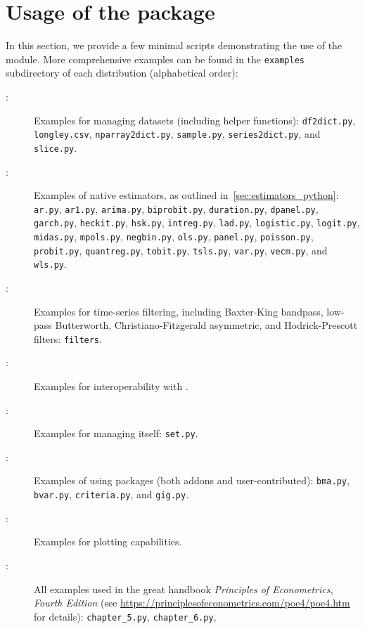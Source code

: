 \chapter{Usage of the package}\label{sec:usage_of_the_package}
In this section, we provide a few minimal \python
scripts demonstrating the use of the \gretlpy module.
More comprehensive examples can be found in the
\texttt{examples} subdirectory of each \gretlpy distribution
(alphabetical order):
\begin{description}
	\item[:] Examples for managing
		datasets (including helper functions): \texttt{df2dict.py},
		\texttt{longley.csv}, \texttt{nparray2dict.py},
		\texttt{sample.py}, \texttt{series2dict.py},
		and \texttt{slice.py}.
	\item[:] Examples of native estimators,
		as outlined in~\ref{sec:estimators_python}: \texttt{ar.py},
		\texttt{ar1.py}, \texttt{arima.py}, \texttt{biprobit.py},
		\texttt{duration.py}, \texttt{dpanel.py}, \texttt{garch.py},
		\texttt{heckit.py}, \texttt{hsk.py}, \texttt{intreg.py},
		\texttt{lad.py}, \texttt{logistic.py}, \texttt{logit.py},
		\texttt{midas.py}, \texttt{mpols.py}, \texttt{negbin.py}, \texttt{ols.py},
		\texttt{panel.py}, \texttt{poisson.py}, \texttt{probit.py},
		\texttt{quantreg.py}, \texttt{tobit.py}, \texttt{tsls.py},
		\texttt{var.py}, \texttt{vecm.py}, and \texttt{wls.py}.
	\item[:] Examples for time-series filtering,
		including Baxter-King bandpass, low-pass Butterworth,
		Christiano-Fitzgerald asymmetric, and Hodrick-Prescott
		filters: \texttt{filters}.
	\item[:] Examples for interoperability with \hansl.
	\item[:] Examples for managing
		\gretlpy itself: \texttt{set.py}.
	\item[:] Examples of using \gretl packages
		(both addons and user-contributed): \texttt{bma.py}, \texttt{bvar.py},
			\texttt{criteria.py}, and \texttt{gig.py}.
	\item[:] Examples for \gretlpy plotting capabilities.
	\item[:] All
		examples used in the great handbook \textit{Principles of Econometrics,
		Fourth Edition} (see \url{https://principlesofeconometrics.com/poe4/poe4.htm}
		for details): \texttt{chapter\_5.py}, \texttt{chapter\_6.py},

\end{description}
